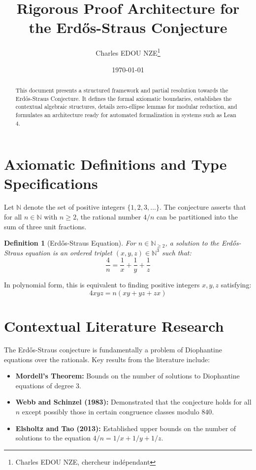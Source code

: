 \documentclass[12pt,a4paper]{article}
\title{Rigorous Proof Architecture for the Erd\H{o}s-Straus Conjecture}
\author{Charles EDOU NZE\thanks{Charles EDOU NZE, chercheur ind\'ependant}}
\date{\today}
\newtheorem{definition}{Definition}
\begin{document}
\maketitle

\begin{abstract}
This document presents a structured framework and partial resolution towards the Erd\H{o}s-Straus Conjecture. It defines the formal axiomatic boundaries, establishes the contextual algebraic structures, details zero-ellipse lemmas for modular reduction, and formulates an architecture ready for automated formalization in systems such as Lean 4.
\end{abstract}

\tableofcontents
\newpage

\section{Axiomatic Definitions and Type Specifications}

Let $\mathbb{N}$ denote the set of positive integers $\{1, 2, 3, \ldots\}$. The conjecture asserts that for all $n \in \mathbb{N}$ with $n \geq 2$, the rational number $4/n$ can be partitioned into the sum of three unit fractions.

\begin{definition}[Erd\H{o}s-Straus Equation]
For $n \in \mathbb{N}_{\geq 2}$, a solution to the Erd\H{o}s-Straus equation is an ordered triplet $(x, y, z) \in \mathbb{N}^3$ such that:
$$ \frac{4}{n} = \frac{1}{x} + \frac{1}{y} + \frac{1}{z} $$
\end{definition}

In polynomial form, this is equivalent to finding positive integers $x, y, z$ satisfying:
$$ 4xyz = n(xy + yz + zx) $$

\section{Contextual Literature Research}

The Erd\H{o}s-Straus conjecture is fundamentally a problem of Diophantine equations over the rationals. Key results from the literature include:
\begin{itemize}
    \item \textbf{Mordell's Theorem:} Bounds on the number of solutions to Diophantine equations of degree 3.
    \item \textbf{Webb and Schinzel (1983):} Demonstrated that the conjecture holds for all $n$ except possibly those in certain congruence classes modulo $840$.
    \item \textbf{Elsholtz and Tao (2013):} Established upper bounds on the number of solutions to the equation $4/n = 1/x + 1/y + 1/z$.
\end{itemize}
\end{document}

